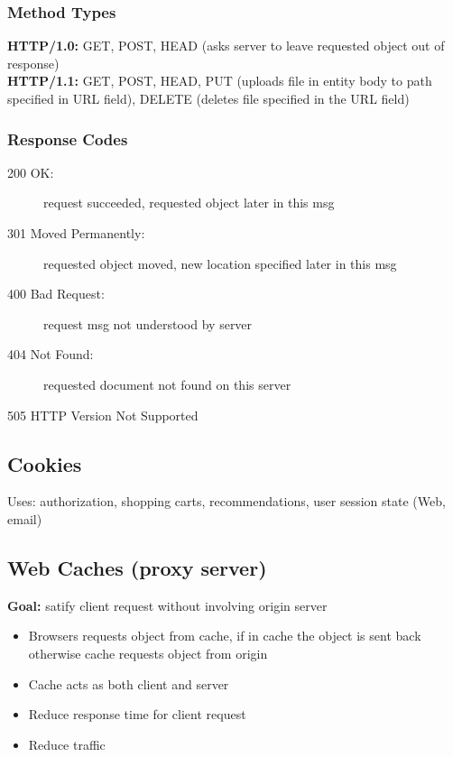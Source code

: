\subsubsection{Method Types}
\textbf{HTTP/1.0:} GET, POST, HEAD (asks server to leave requested object out of response)\\
\textbf{HTTP/1.1:} GET, POST, HEAD, PUT (uploads file in entity body to path specified in URL field), DELETE (deletes file specified in the URL field)
\subsubsection{Response Codes}
\begin{description}
	\item[200 OK:] request succeeded, requested object later in this msg
	\item[301 Moved Permanently:] requested object moved, new location specified later in this msg
	\item[400 Bad Request:] request msg not understood by server
	\item[404 Not Found:] requested document not found on this server
	\item[505 HTTP Version Not Supported]
\end{description}

\subsection{Cookies}
Uses: authorization, shopping carts, recommendations, user session state (Web, email)

\subsection{Web Caches (proxy server)}
\begin{leftbar}
	\textbf{Goal:} satify client request without involving origin server
\end{leftbar}
\begin{itemize}
	\item Browsers requests object from cache, if in cache the object is sent back otherwise cache requests object from origin
	\item Cache acts as both client and server
	\item Reduce response time for client request
	\item Reduce traffic
\end{itemize}


